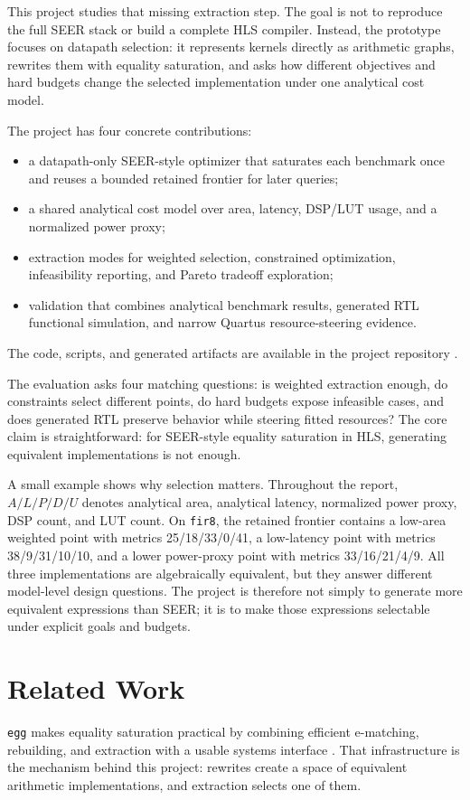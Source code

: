 \documentclass[sigplan,10pt,review]{acmart}
\begin{document}
This project studies that missing extraction step. The goal is not to reproduce the full SEER stack or build a complete HLS compiler. Instead, the prototype focuses on datapath selection: it represents kernels directly as arithmetic graphs, rewrites them with equality saturation, and asks how different objectives and hard budgets change the selected implementation under one analytical cost model.

The project has four concrete contributions:
\begin{itemize}
\item a datapath-only SEER-style optimizer that saturates each benchmark once and reuses a bounded retained frontier for later queries;
\item a shared analytical cost model over area, latency, DSP/LUT usage, and a normalized power proxy;
\item extraction modes for weighted selection, constrained optimization, infeasibility reporting, and Pareto tradeoff exploration;
\item validation that combines analytical benchmark results, generated RTL functional simulation, and narrow Quartus resource-steering evidence.
\end{itemize}

The code, scripts, and generated artifacts are available in the project repository \cite{seeroptimizerrepo}.

The evaluation asks four matching questions: is weighted extraction enough, do constraints select different points, do hard budgets expose infeasible cases, and does generated RTL preserve behavior while steering fitted resources? The core claim is straightforward: for SEER-style equality saturation in HLS, generating equivalent implementations is not enough.

A small example shows why selection matters. Throughout the report, $A/L/P/D/U$ denotes analytical area, analytical latency, normalized power proxy, DSP count, and LUT count. On \texttt{fir8}, the retained frontier contains a low-area weighted point with metrics 25/18/33/0/41, a low-latency point with metrics 38/9/31/10/10, and a lower power-proxy point with metrics 33/16/21/4/9. All three implementations are algebraically equivalent, but they answer different model-level design questions. The project is therefore not simply to generate more equivalent expressions than SEER; it is to make those expressions selectable under explicit goals and budgets.

\section{Related Work}
\texttt{egg} makes equality saturation practical by combining efficient e-matching, rebuilding, and extraction with a usable systems interface \cite{willsey2021egg}. That infrastructure is the mechanism behind this project: rewrites create a space of equivalent arithmetic implementations, and extraction selects one of them.
\end{document}
